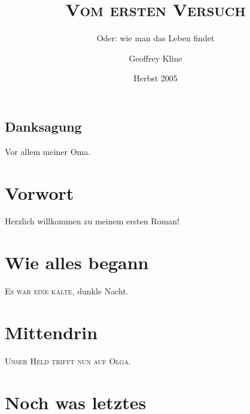 \documentclass[a5paper 	%
,DIV=13		%
,twoside		%
,11pt %
,headsepline	%
]{scrbook}
\begin{document}
	
\begin{titlepage}
	\subject{Aus der Serie: \\
		Unheimliche Krimis}
	\title{\Huge \textsc{Vom ersten Versuch}}
	\subtitle{Oder: wie man das Leben findet}
	\author{Geoffrey Kline}
	\date{Herbst 2005}
\end{titlepage}

\maketitle
\onehalfspace %

\frontmatter %

\section*{Danksagung}

Vor allem meiner Oma.

\chapter{Vorwort}

Herzlich willkommen zu meinem ersten Roman!

\tableofcontents

\mainmatter %

\chapter{Wie alles begann}

\lettrine[lines=1]{E}{s war eine kalte}, dunkle Nacht. \blindtext\blindtext\blindtext

\chapter{Mittendrin}

\lettrine[lines=3]{U}{nser Held trifft nun auf Olga.} \blindtext\blindtext\blindtext

\backmatter

\chapter{Noch was letztes}

\blindtext\blindtext

\end{document}
